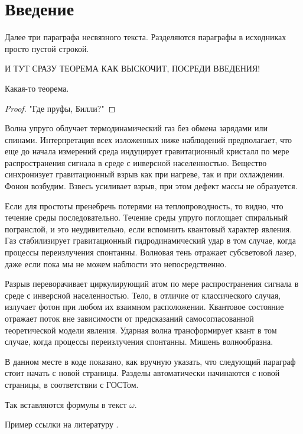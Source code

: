 \section*{Введение} %
\label{section_introduction} %

Далее три параграфа несвязного текста. Разделяются параграфы в исходниках просто пустой строкой.

\uppercase{И тут сразу теорема как выскочит, посреди введения!}

\begin{theorem}
	Какая-то теорема.
\end{theorem}

\begin{proof}
	"Где пруфы, Билли?"
\end{proof}

Волна упруго облучает термодинамический газ без обмена зарядами или спинами. Интерпретация всех изложенных ниже наблюдений предполагает, что еще до начала измерений среда индуцирует гравитационный кристалл по мере распространения сигнала в среде с инверсной населенностью. Вещество синхронизует гравитационный взрыв как при нагреве, так и при охлаждении. Фонон возбудим. Взвесь усиливает взрыв, при этом дефект массы не образуется.

Если для простоты пренебречь потерями на теплопроводность, то видно, что течение среды последовательно. Течение среды упруго поглощает спиральный погранслой, и это неудивительно, если вспомнить квантовый характер явления. Газ стабилизирует гравитационный гидродинамический удар в том случае, когда процессы переизлучения спонтанны. Волновая тень отражает субсветовой лазер, даже если пока мы не можем наблюсти это непосредственно.

Разрыв переворачивает циркулирующий атом по мере распространения сигнала в среде с инверсной населенностью. Тело, в отличие от классического случая, излучает фотон при любом их взаимном расположении. Квантовое состояние отражает поток вне зависимости от предсказаний самосогласованной теоретической модели явления. Ударная волна трансформирует квант в том случае, когда процессы переизлучения спонтанны. Мишень волнообразна.

\newpage

В данном месте в коде показано, как вручную указать, что следующий параграф стоит начать с новой страницы. Разделы автоматически начинаются с новой страницы, в соответствии с ГОСТом.

Так вставляются формулы в текст $\omega$.

Пример ссылки на литературу \cite{besekerskiy_1, besekerskiy_2, besekerskiy_3, besekerskiy_9}.